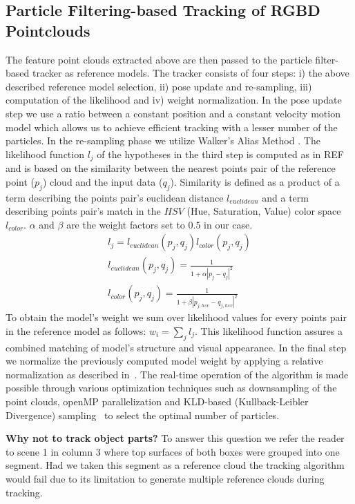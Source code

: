 \subsection{Particle Filtering-based Tracking of RGBD Pointclouds}
\label{sec:tracking}
The feature point clouds extracted above are then passed to the
particle filter-based tracker as reference models. The tracker 
consists of four steps: i) the above described reference model
selection, ii) pose update and re-sampling, iii) computation of the
likelihood and iv)
weight normalization. In the pose update step we use a ratio between
a constant position and a constant velocity motion model which allows
us to achieve efficient tracking with a lesser number of the
particles. In the re-sampling phase we utilize Walker’s Alias Method
\cite{Walker}. The likelihood function $l_{j}$ of the hypotheses in the third
step is computed as in REF%
 and is based on the similarity  between the nearest points
pair of the reference point ($p_{j}$) cloud and the input data ($q_{j}$). Similarity is
defined as a product of a term describing the points pair's euclidean distance $l_{euclidean}$ 
and a term describing points pair's match in the $HSV$ (Hue, Saturation, Value) color
space $l_{color}$. $\alpha$ and $\beta$ are the weight factors set to $0.5$ in our case.
\begin{eqnarray}
  l_{j} = l_{euclidean}(p_{j},q_{j})l_{color}(p_{j},q_{j}) \nonumber \\
  l_{euclidean}(p_{j},q_{j}) = \frac{1}{1+\alpha|p_{j}-q_{j}|^2} \nonumber \\
  l_{color}(p_{j},q_{j}) = \frac{1}{1+\beta|p_{j,hsv}-q_{j,hsv}|^2} 
  \label{eq:likelihood}
\end{eqnarray}
To obtain the model's weight we sum over likelihood values for
every points pair in the reference model as follows: $w_{i} = \sum\limits_{j}l_{j}$. This likelihood function assures a combined
matching of model's structure and visual appearance. In the final step we normalize the 
previously computed model weight by applying a relative normalization as
described in~\cite{AzadMAD11}. The real-time operation of the algorithm
is made possible through various optimization techniques such as
downsampling of the point clouds, openMP parallelization and KLD-based 
(Kullback-Leibler Divergence) 
sampling~\cite{Fox01KLD} to select the optimal number of particles.


\textbf{Why not to track object parts?} To answer this question we refer the reader 
to scene 1 in %
 column 3 where top surfaces of both boxes were grouped into one segment.
Had we taken this segment as a reference cloud the tracking algorithm would fail due
to its limitation to generate multiple reference clouds during tracking.


